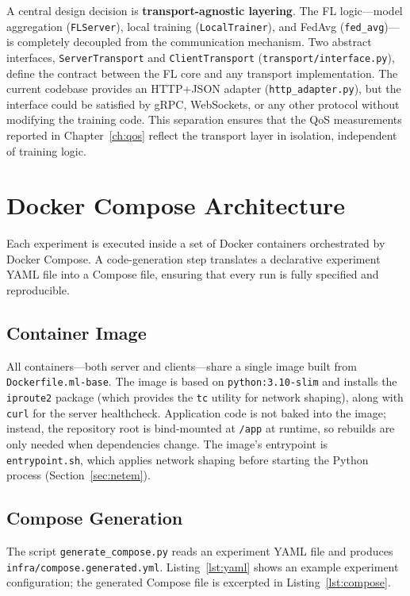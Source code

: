 \documentclass[12pt,a4paper]{report}
\begin{document}
A central design decision is \textbf{transport-agnostic layering}.  The
FL logic---model aggregation (\texttt{FLServer}), local training
(\texttt{LocalTrainer}), and FedAvg (\texttt{fed\_avg})---is completely
decoupled from the communication mechanism.  Two abstract interfaces,
\texttt{ServerTransport} and \texttt{ClientTransport}
(\texttt{transport/interface.py}), define the contract between the FL
core and any transport implementation.  The current codebase provides an
HTTP+JSON adapter (\texttt{http\_adapter.py}), but the interface could
be satisfied by gRPC, WebSockets, or any other protocol without modifying
the training code.  This separation ensures that the QoS measurements
reported in Chapter~\ref{ch:qos} reflect the transport layer in
isolation, independent of training logic.

\section{Docker Compose Architecture}

Each experiment is executed inside a set of Docker containers orchestrated
by Docker Compose.  A code-generation step translates a declarative
experiment YAML file into a Compose file, ensuring that every run is
fully specified and reproducible.

\subsection{Container Image}

All containers---both server and clients---share a single image built from
\texttt{Dockerfile.ml-base}.  The image is based on
\texttt{python:3.10-slim} and installs the \texttt{iproute2} package
(which provides the \texttt{tc} utility for network shaping), along with
\texttt{curl} for the server healthcheck.  Application code is not baked
into the image; instead, the repository root is bind-mounted at
\texttt{/app} at runtime, so rebuilds are only needed when dependencies
change.  The image's entrypoint is \texttt{entrypoint.sh}, which applies
network shaping before starting the Python process
(Section~\ref{sec:netem}).

\subsection{Compose Generation}

The script \texttt{generate\_compose.py} reads an experiment YAML file
and produces \texttt{infra/compose.generated.yml}.
Listing~\ref{lst:yaml} shows an example experiment configuration; the
generated Compose file is excerpted in Listing~\ref{lst:compose}.
\end{document}
